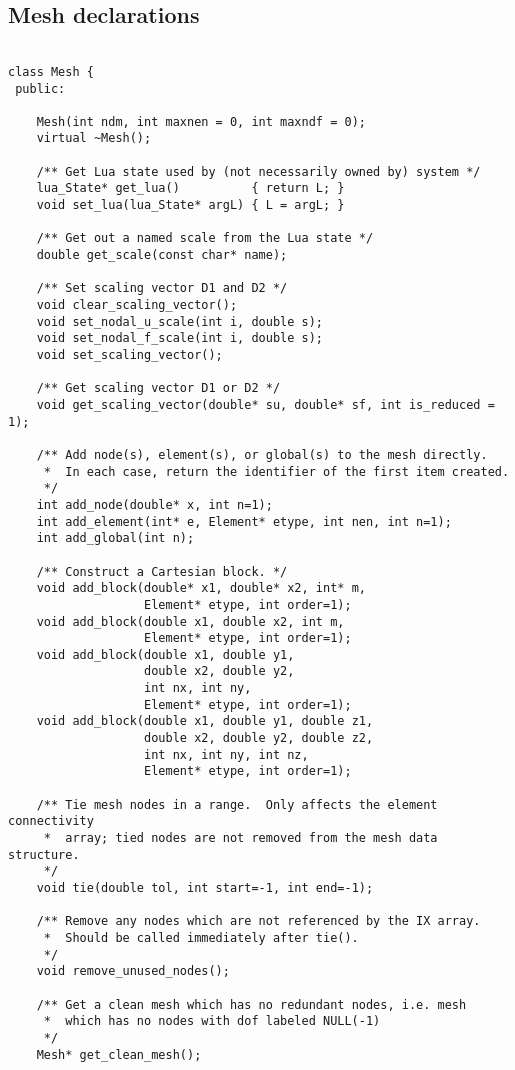 \subsection{Mesh declarations}
\begin{verbatim}

class Mesh {
 public:

    Mesh(int ndm, int maxnen = 0, int maxndf = 0);
    virtual ~Mesh();

    /** Get Lua state used by (not necessarily owned by) system */
    lua_State* get_lua()          { return L; }
    void set_lua(lua_State* argL) { L = argL; }

    /** Get out a named scale from the Lua state */
    double get_scale(const char* name);

    /** Set scaling vector D1 and D2 */
    void clear_scaling_vector();
    void set_nodal_u_scale(int i, double s);
    void set_nodal_f_scale(int i, double s);
    void set_scaling_vector();

    /** Get scaling vector D1 or D2 */
    void get_scaling_vector(double* su, double* sf, int is_reduced = 1);

    /** Add node(s), element(s), or global(s) to the mesh directly.
     *  In each case, return the identifier of the first item created.
     */
    int add_node(double* x, int n=1);
    int add_element(int* e, Element* etype, int nen, int n=1);
    int add_global(int n);

    /** Construct a Cartesian block. */
    void add_block(double* x1, double* x2, int* m,
                   Element* etype, int order=1);
    void add_block(double x1, double x2, int m,
                   Element* etype, int order=1);
    void add_block(double x1, double y1,
                   double x2, double y2,
                   int nx, int ny,
                   Element* etype, int order=1);
    void add_block(double x1, double y1, double z1,
                   double x2, double y2, double z2,
                   int nx, int ny, int nz,
                   Element* etype, int order=1);

    /** Tie mesh nodes in a range.  Only affects the element connectivity
     *  array; tied nodes are not removed from the mesh data structure.
     */
    void tie(double tol, int start=-1, int end=-1);

    /** Remove any nodes which are not referenced by the IX array.
     *  Should be called immediately after tie().
     */
    void remove_unused_nodes();

    /** Get a clean mesh which has no redundant nodes, i.e. mesh
     *  which has no nodes with dof labeled NULL(-1)
     */
    Mesh* get_clean_mesh();


\end{verbatim}
